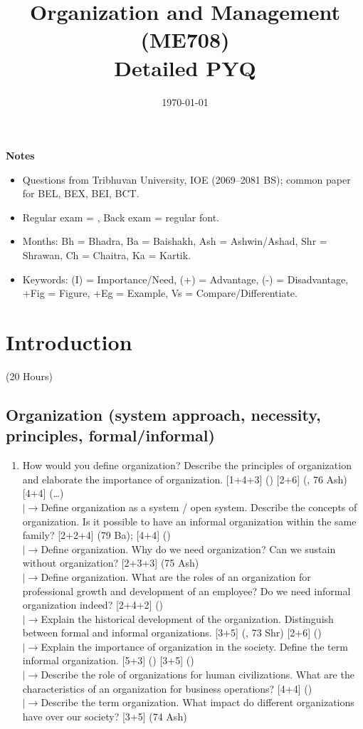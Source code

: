 \documentclass[12pt]{article}
\title{Organization and Management (ME708)\\[0.4em]\large Detailed PYQ}
\author{}
\date{\today}
\newcommand{\lb}{\\$\left|\rightarrow\right.$}
\begin{document}
\maketitle
\vspace{6cm}
\textbf{Notes}
\begin{itemize}[noitemsep]
  \item Questions from Tribhuvan University, IOE (2069--2081 BS); common paper for BEL, BEX, BEI, BCT.
  \item Regular exam = , Back exam = regular font.
  \item Months: Bh = Bhadra, Ba = Baishakh, Ash = Ashwin/Ashad, Shr = Shrawan, Ch = Chaitra, Ka = Kartik.
  \item Keywords: (I) = Importance/Need, (+) = Advantage, (-) = Disadvantage, +Fig = Figure, +Eg = Example, Vs = Compare/Differentiate.
\end{itemize}
\pagebreak
\tableofcontents
\pagebreak

\section{Introduction}
\begin{center}(20 Hours)\end{center}

  \subsection{Organization (system approach, necessity, principles, formal/informal)}
    \begin{enumerate}[topsep=0pt, noitemsep]
      \item How would you define organization? Describe the principles of organization and elaborate the importance of organization. \hfill [1+4+3] () [2+6] (, 76 Ash) [4+4] (\dots)
        \lb Define organization as a system / open system. Describe the concepts of organization. Is it possible to have an informal organization within the same family? \hfill [2+2+4] (79 Ba); [4+4] ()
        \lb Define organization. Why do we need organization? Can we sustain without organization? \hfill [2+3+3] (75 Ash)
        \lb Define organization. What are the roles of an organization for professional growth and development of an employee? Do we need informal organization indeed? \hfill [2+4+2] ()
        \lb Explain the historical development of the organization. Distinguish between formal and informal organizations. \hfill [3+5] (, 73 Shr) [2+6] ()
        \lb Explain the importance of organization in the society. Define the term informal organization. \hfill [5+3] () [3+5] ()
        \lb Describe the role of organizations for human civilizations. What are the characteristics of an organization for business operations? \hfill [4+4] ()
        \lb Describe the term organization. What impact do different organizations have over our society? \hfill [3+5] (74 Ash)
    \end{enumerate}
\end{document}
